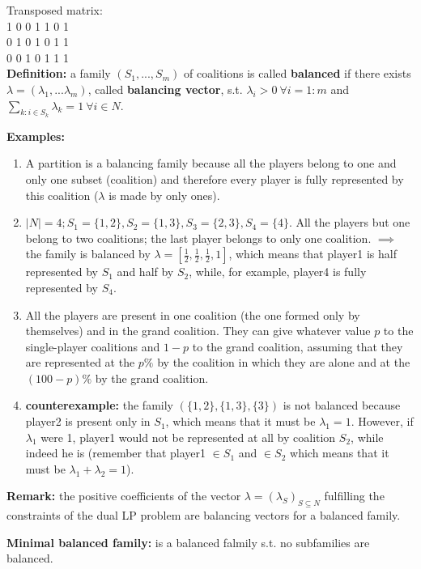 \noindent Transposed matrix:\\
1	0	0	1	1	0	1\\
0	1	0	1	0	1	1\\
0	0	1	0	1	1	1\\

\bigskip
\noindent \textbf{Definition:} a family $(S_1,...,S_m)$ of coalitions is called \textbf{balanced} if there exists  $\lambda = (\lambda_1,...\lambda_m)$, called \textbf{balancing vector}, s.t. $\lambda_i > 0 ~\forall i=1:m$ and $\sum_{k: i \in S_k}\lambda_k = 1 ~\forall i \in N$.

\bigskip
\noindent \textbf{Examples:}
\begin{enumerate}
\item A partition is a balancing family because all the players belong to 
one and only one subset (coalition) and therefore every player is fully 
represented by this coalition ($\lambda$ is made by only ones).
\item $|N| = 4; S_1 = \{1,2\}, S_2 = \{1,3\}, S_3 = \{2,3\}, S_4 = \{4\}$. All the players but one belong to two coalitions; the 
last player belongs to only one coalition. $\implies$ the family is balanced by $\lambda = \left[\frac{1}{2},\frac{1}{2},\frac{1}{2},1\right]$, which means that player1 is half represented by $S_1$ and half by $S_2$, while, for example, player4 is fully represented by $S_4$.
\item All the players are present in one coalition (the one formed only by themselves) and in the grand coalition. 
They can give whatever value $p$ to the single-player coalitions and $1-p$ to the grand coalition, assuming that they are represented at the $p\%$ by the coalition in which they are alone and at the $(100-p)\%$ by the grand coalition.
\item \textbf{counterexample:} the family $(\{1,2\},\{1,3\},\{3\})$ is not balanced because player2 is present only in $S_1$, which means that it must be $\lambda_1 = 1$. However, if $\lambda_1$ were 1, player1 would not be represented at all by coalition $S_2$, while indeed he is (remember that player1 $\in S_1$ and $\in S_2$ which means that it must be $\lambda_1 + \lambda_2 = 1$).
\end{enumerate}

\bigskip
\noindent \textbf{Remark:} the positive coefficients of the vector $\lambda = (\lambda_S)_{S \subseteq N}$ fulfilling the constraints of the dual LP problem are balancing vectors for a balanced family.

\bigskip
\noindent \textbf{Minimal balanced family:} is a balanced falmily s.t. no subfamilies are balanced.

